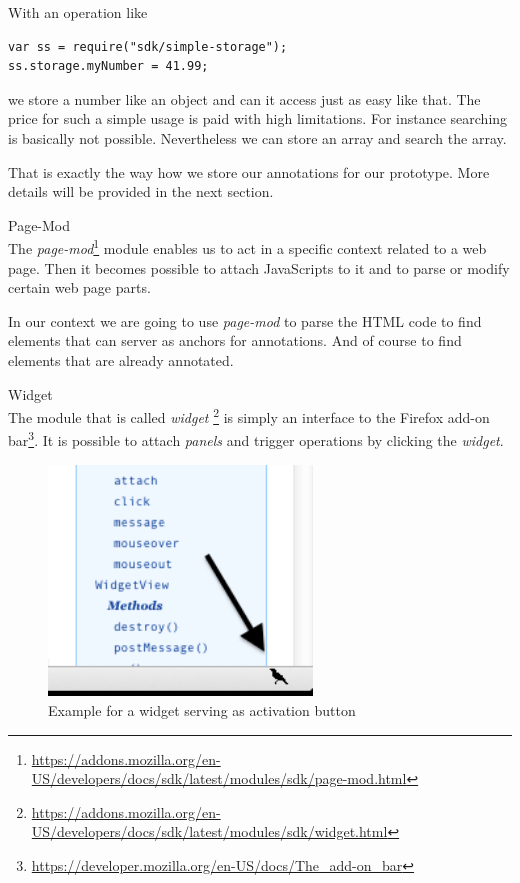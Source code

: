 \begin{description}
With an operation like

\begin{lstlisting}
var ss = require("sdk/simple-storage");
ss.storage.myNumber = 41.99;
\end{lstlisting}

we store a number like an object and can it access just as easy like that. The price for such a simple usage is paid with high limitations. For instance searching is basically not possible. Nevertheless we can store an array and search the array. 

That is exactly the way how we store our annotations for our prototype. More details will be provided in the next section.

\item Page-Mod\\
The \emph{page-mod}\footnote{\url{https://addons.mozilla.org/en-US/developers/docs/sdk/latest/modules/sdk/page-mod.html}} module enables us to act in a specific context related to a web page. Then it becomes possible to attach JavaScripts to it and to parse or modify certain web page parts.

In our context we are going to use \emph{page-mod} to parse the HTML code to find elements that can server as anchors for annotations. And of course to find elements that are already annotated.

\item Widget\\
The module that is called \emph{widget} \footnote{\url{https://addons.mozilla.org/en-US/developers/docs/sdk/latest/modules/sdk/widget.html}} is simply an interface to the Firefox add-on bar\footnote{\url{https://developer.mozilla.org/en-US/docs/The_add-on_bar}}. It is possible to attach \emph{panels} and trigger operations by clicking the \emph{widget}. 

\begin{figure}[h!] \centering
		\includegraphics[width=7cm]{images/example-widget.png}
		\caption{Example for a widget serving as activation button}
		\label{example-widget}
\end{figure} 


\end{description}
